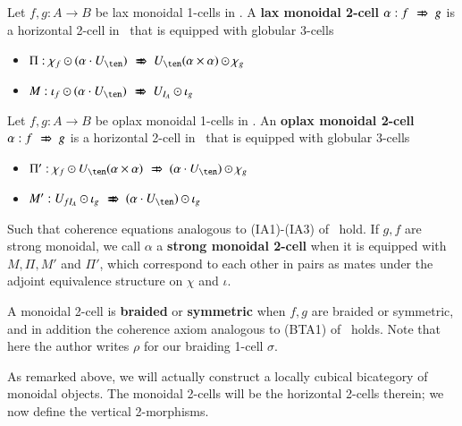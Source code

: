 \begin{defn}\label{Def:monverttrans}
Let $f, g:A \rightarrow B$ be lax monoidal 1-cells in \fB. A {\bf lax monoidal 2-cell} $\alpha: f \xslashedRightarrow{} g$ is a horizontal 2-cell in \fB\ that is equipped with globular 3-cells
\begin{itemize}
\item $\Pi: \chi_f \horc (\alpha \comp U_{\ten}) \xslashedRightarrow{} U_{\ten}(\alpha \times \alpha) \horc \chi_g$
\item $M: \iota_f \horc (\alpha \comp U_{\ten}) \xslashedRightarrow{} U_{I_A} \horc \iota_g$
\end{itemize}

Let $f, g:A \rightarrow B$ be oplax monoidal 1-cells in \fB. An {\bf oplax monoidal 2-cell} $\alpha: f \xslashedRightarrow{} g$ is a horizontal 2-cell in \fB\ that is equipped with globular 3-cells
\begin{itemize}
\item $\Pi': \chi_f \horc U_{\ten}(\alpha \times \alpha)  \xslashedRightarrow{} (\alpha \comp U_{\ten}) \horc \chi_g $
\item $M':   U_{f I_A} \horc \iota_g \xslashedRightarrow{} (\alpha \comp U_{\ten}) \horc \iota_g $
\end{itemize}
\end{defn}

Such that coherence equations analogous to (IA1)-(IA3) of~\cite{gg:ldstr-tricat} hold.
If $g,f$ are strong monoidal, we call $\alpha$ a {\bf strong monoidal 2-cell} when it is equipped with $M, \Pi, M '$ and $\Pi '$, which correspond to each other in pairs as mates under the adjoint equivalence structure on $\chi$ and $\iota$.

A monoidal 2-cell is {\bf braided} or {\bf symmetric} when $f,g$ are braided or symmetric, and in addition the coherence axiom analogous to (BTA1) of~\cite[p143]{mccrudden:bal-coalgb} holds. Note that here the author writes $\rho$ for our braiding 1-cell $\sigma$.


As remarked above, we will actually construct a locally cubical bicategory of monoidal objects.
The monoidal 2-cells will be the horizontal 2-cells therein; we now define the vertical 2-morphisms.

